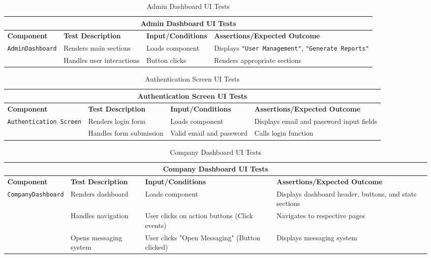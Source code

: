 \begin{table}[ht]
\centering
\begin{tabular}{|p{3cm}|p{4cm}|p{4cm}|p{5cm}|}
\hline
\multicolumn{4}{|c|}{\textbf{Admin Dashboard UI Tests}} \\
\hline
\textbf{Component} & \textbf{Test Description} & \textbf{Input/Conditions} & \textbf{Assertions/Expected Outcome} \\
\hline
\multirow{2}{*}{\texttt{AdminDashboard}}
 & Renders main sections 
 & Loads component 
 & Displays \texttt{"User Management"}, \texttt{"Generate Reports"} \\ \cline{2-4}
 & Handles user interactions
 & Button clicks
 & Renders appropriate sections \\
\hline
\end{tabular}
\caption{Admin Dashboard UI Tests}
\label{tab:admin_dashboard_ui_tests}
\end{table}

\begin{table}[ht]
\centering
\begin{tabular}{|p{3cm}|p{4cm}|p{4cm}|p{5cm}|}
\hline
\multicolumn{4}{|c|}{\textbf{Authentication Screen UI Tests}} \\
\hline
\textbf{Component} & \textbf{Test Description} & \textbf{Input/Conditions} & \textbf{Assertions/Expected Outcome} \\
\hline
\multirow{2}{*}{\texttt{Authentication Screen}}
 & Renders login form
 & Loads component
 & Displays email and password input fields \\ \cline{2-4}
 & Handles form submission
 & Valid email and password
 & Calls login function \\
\hline
\end{tabular}
\caption{Authentication Screen UI Tests}
\label{tab:authentication_screen_ui_tests}
\end{table}

\begin{table}[ht]
\centering
\begin{tabular}{|p{3cm}|p{4cm}|p{4cm}|p{5cm}|}
\hline
\multicolumn{4}{|c|}{\textbf{Company Dashboard UI Tests}} \\
\hline
\textbf{Component} & \textbf{Test Description} & \textbf{Input/Conditions} & \textbf{Assertions/Expected Outcome} \\
\hline
\multirow{3}{*}{\texttt{CompanyDashboard}}
 & Renders dashboard
 & Loads component
 & Displays dashboard header, buttons, and stats sections \\ \cline{2-4}
 & Handles navigation
 & User clicks on action buttons \newline (Click events)
 & Navigates to respective pages \\ \cline{2-4}
 & Opens messaging system
 & User clicks "Open Messaging" \newline (Button clicked)
 & Displays messaging system \\
\hline
\end{tabular}
\caption{Company Dashboard UI Tests}
\label{tab:company_dashboard_ui_tests}
\end{table}

